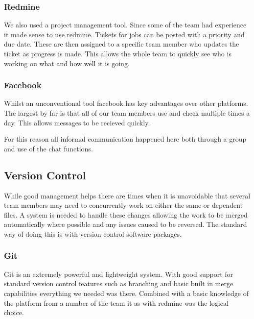 \subsubsection*{Redmine}

We also used a project management tool. Since some of the team had
experience it made sense to use redmine. Tickets for jobs can be posted
with a priority and due date. These are then assigned to a specific
team member who updates the ticket as progress is made. This allows
the whole team to quickly see who is working on what and how well
it is going.


\subsubsection*{Facebook}

Whilst an unconventional tool facebook has key advantages over other
platforms. The largest by far is that all of our team members use
and check multiple times a day. This allows messages to be recieved
quickly.

For this reason all informal communication happened here both through
a group and use of the chat functions.


\subsection*{Version Control}

While good management helps there are times when it is unavoidable
that several team members may need to concurrently work on either
the same or dependent files. A system is needed to handle these changes
allowing the work to be merged automatically where possible and any
issues caused to be reversed. The standard way of doing this is with
version control software packages.


\subsubsection*{Git}

Git is an extremely powerful and lightweight system. With good support
for standard version control features such as branching and basic
built in merge capabilities everything we needed was there. Combined
with a basic knowledge of the platform from a number of the team it
as with redmine was the logical choice.
